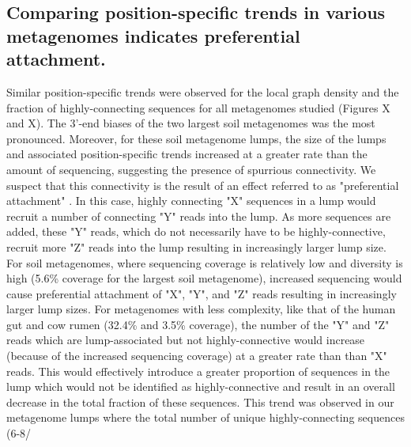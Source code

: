 \documentclass[11pt]{article} %
\begin{document}
\subsection{Comparing position-specific trends in various metagenomes indicates preferential attachment.}
Similar position-specific trends were observed for the local graph density and the fraction of highly-connecting sequences for all metagenomes studied (Figures X and X).  The 3'-end biases of the two largest soil metagenomes was the most pronounced.  Moreover, for these soil metagenome lumps, the size of the lumps and associated position-specific trends increased at a greater rate than the amount of sequencing, suggesting the presence of spurrious connectivity.  We suspect that this connectivity is the result of an effect referred to as "preferential attachment" \cite{Barabasi:1999p1083}. In this case, highly connecting "X" sequences in a lump would recruit a number of connecting "Y" reads into the lump.  As more sequences are added, these "Y" reads, which do not necessarily have to be highly-connective, recruit more "Z" reads into the lump resulting in increasingly larger lump size.  For soil metagenomes, where sequencing coverage is relatively low and diversity is high (5.6\% coverage for the largest soil metagenome), increased sequencing would cause preferential attachment of "X", "Y", and "Z" reads resulting in increasingly larger lump sizes.  For metagenomes with less complexity, like that of the human gut and cow rumen (32.4\% and 3.5\% coverage), the number of the "Y" and "Z" reads which are lump-associated but not highly-connective would increase (because of the increased sequencing coverage) at a greater rate than than "X" reads.   This would effectively introduce a greater proportion of sequences in the lump which would not be identified as highly-connective and result in an overall decrease in the total fraction of these sequences.   This trend was observed in our metagenome lumps where the total number of unique highly-connecting sequences (6-8/%
\end{document}
